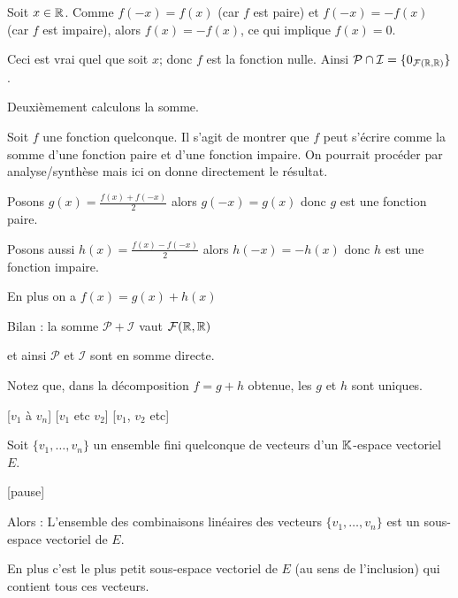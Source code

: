 \change

  Soit $x \in \mathbb{R}$. Comme $f(-x)=f(x)$ (car $f$ est paire) et $f(-x)=-f(x)$ 
  (car $f$ est impaire), alors $f(x)=-f(x)$, ce qui implique $f(x)=0$. 
  
 \change
 
  Ceci est vrai quel que soit $x$; donc $f$ est la fonction nulle.
  Ainsi $\mathcal{P} \cap \mathcal{I} = \{ 0_{\mathcal{F}(\mathbb{R},\mathbb{R})} \}$.
 
 \change
 
 Deuxièmement calculons la somme.
  
  \change
  
  Soit $f$ une fonction quelconque. Il s'agit de montrer que $f$ peut s'écrire comme la somme 
  d'une fonction paire et d'une fonction impaire. On pourrait procéder par analyse/synthèse mais ici on donne directement le résultat.
  
  \change
  
  Posons $g(x)=\frac{f(x)+f(-x)}2$ alors $g(-x)=g(x)$ donc $g$ est une fonction paire.
  
  \change
  
  Posons aussi $h(x)=\frac{f(x)-f(-x)}2$ alors $h(-x)=-h(x)$ donc $h$ est une fonction impaire.
  
  \change
  
  En plus on a $f(x)=g(x)+h(x)$
  
  Bilan : la somme $\mathcal{P}+\mathcal{I}$ vaut $\mathcal{F}(\mathbb{R},\mathbb{R})$
  
  et ainsi $\mathcal{P}$ et $\mathcal{I}$ sont en somme directe.
  
  Notez que, dans la décomposition $f=g+h$ obtenue, les $g$ et $h$ sont uniques.



\diapo

[$v_1$ à $v_n$] [$v_1$ etc $v_2$] [$v_1$, $v_2$ etc]

Soit  $\{v_1, \dots , v_n\}$ un ensemble fini quelconque de vecteurs d'un 
$\mathbb{K}$-espace vectoriel $E$.

[pause]

Alors : L'ensemble des combinaisons linéaires des vecteurs 
  $\{v_1, \dots , v_n\}$ est un sous-espace vectoriel de $E$.
  
  
\change

En plus c'est le plus petit sous-espace vectoriel de $E$ 
  (au sens de l'inclusion) qui contient tous ces vecteurs. 


\change


